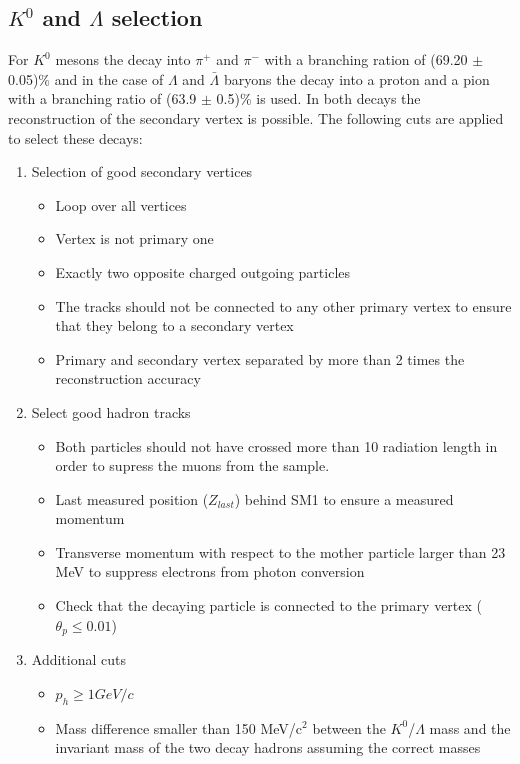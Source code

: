 \subsection{$K^0$ and $\Lambda$ selection}

For $K^0$ mesons the decay into $\pi^+$ and $\pi^-$ with a branching ration of (69.20 $\pm$ 0.05)\% \cite{PDG} and in the case of $\Lambda$ and $\bar{\Lambda}$ baryons the decay into a proton and a pion with a branching ratio of (63.9 $\pm$ 0.5)\% \cite{PDG} is used. In both decays the reconstruction of the secondary vertex is possible. The following cuts are applied to select these decays:

\begin{enumerate}
  \item Selection of good secondary vertices
  \begin{itemize}
    \item Loop over all vertices
    \item Vertex is not primary one
    \item Exactly two opposite charged outgoing particles
    \item The tracks should not be connected to any other primary vertex to ensure that they belong to a secondary vertex
    \item Primary and secondary vertex separated by more than 2 times the reconstruction accuracy
  \end{itemize}
  \item Select good hadron tracks
  \begin{itemize}
    \item Both particles should not have crossed more than 10 radiation length in order to supress the muons from the sample.
    \item Last measured position ($Z_{last}$) behind SM1 to ensure a measured momentum
    \item Transverse momentum with respect to the mother particle larger than 23 MeV to suppress electrons from photon conversion
    \item Check that the decaying particle is connected to the primary vertex ($\theta_p \le 0.01$)
  \end{itemize}
  \item Additional cuts
  \begin{itemize}
    \item $p_h \geq 1 GeV/c$
    \item Mass difference smaller than 150 MeV/c$^2$ between the $K^0$/$\Lambda$ mass and the invariant mass of the two decay hadrons assuming the correct masses
  \end{itemize}
\end{enumerate}

